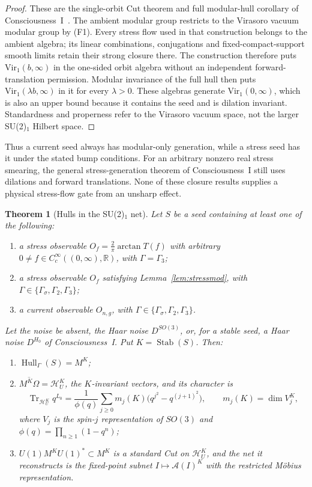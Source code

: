 \documentclass[12pt]{article}
\newtheorem{theorem}{Theorem}[section]
\theoremstyle{definition}
\theoremstyle{remark}
\newcommand{\Hull}{\operatorname{Hull}}
\newcommand{\Stab}{\operatorname{Stab}}
\newcommand{\Vir}{\mathrm{Vir}}
\begin{document}
\begin{proof}
These are the single-orbit Cut theorem and full modular-hull corollary of
Consciousness~I~\cite{PaperI}. The ambient modular group restricts to the
Virasoro vacuum modular group by (F1). Every stress flow used in that
construction belongs to the ambient algebra; its linear combinations,
conjugations and fixed-compact-support smooth limits retain their strong
closure there. The construction therefore puts
\(\Vir_1(b,\infty)\) in the one-sided orbit algebra without an independent
forward-translation permission. Modular invariance of the full hull then
puts \(\Vir_1(\lambda b,\infty)\) in it for every \(\lambda>0\). These
algebras generate \(\Vir_1(0,\infty)\), which is also an upper bound
because it contains the seed and is dilation invariant.
Standardness and properness refer to the Virasoro vacuum space, not the
larger SU(2)\(_1\) Hilbert space.
\end{proof}

Thus a current seed always has modular-only generation, while a stress
seed has it under the stated bump conditions. For an arbitrary nonzero
real stress smearing, the general stress-generation theorem of
Consciousness~I still uses dilations and forward translations.
None of these closure results supplies a physical stress-flow gate
from an unsharp effect.

\begin{theorem}[Hulls in the SU(2)\(_1\) net]\label{thm:su2}
Let \(S\) be a seed containing at least one of the following:
\begin{enumerate}[label=(\roman*),leftmargin=2em]
\item a stress observable \(O_f=\frac2\pi\arctan T(f)\) with arbitrary
  \(0\neq f\in C_c^\infty((0,\infty),\mathbb R)\), with \(\Gamma=\Gamma_3\);
\item a stress observable \(O_f\) satisfying Lemma~\ref{lem:stressmod},
  with \(\Gamma\in\{\Gamma_\sigma,\Gamma_2,\Gamma_3\}\);
\item a current observable \(O_{n,g}\), with
  \(\Gamma\in\{\Gamma_\sigma,\Gamma_2,\Gamma_3\}\).
\end{enumerate}
Let the noise be absent, the Haar noise
\(D^{SO(3)}\), or, for a stable seed, a Haar noise \(D^{H_0}\) of Consciousness~I.
Put \(K=\Stab(S)\). Then:
\begin{enumerate}[label=(\alph*),leftmargin=2em]
\item \(\Hull_\Gamma(S)=M^K\);
\item \(\overline{M^K\Omega}=\mathcal H_U^K\), the \(K\)-invariant vectors, and its
  character is
  \[
  \operatorname{Tr}_{\mathcal H_U^K}q^{L_0}
  =\frac{1}{\phi(q)}\sum_{j\ge0}m_j(K)\bigl(q^{j^2}-q^{(j+1)^2}\bigr),
  \qquad m_j(K)=\dim V_j^K,
  \]
  where \(V_j\) is the spin-\(j\) representation of \(SO(3)\) and
  \(\phi(q)=\prod_{n\ge1}(1-q^n)\);
\item \(U(1)M^KU(1)^*\subset M^K\) is a standard Cut on \(\mathcal H_U^K\), and the net
  it reconstructs is the fixed-point subnet \(I\mapsto\mathcal A(I)^K\) with the
  restricted M\"obius representation.
\end{enumerate}
\end{theorem}
\end{document}
